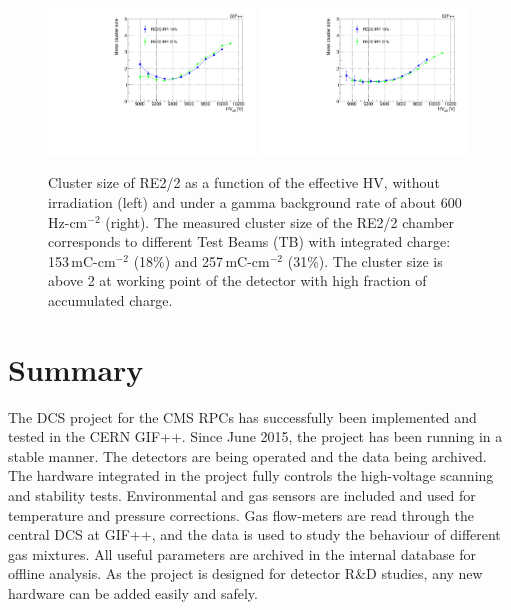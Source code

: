 \begin{figure}[h]
\centering
\includegraphics[width=0.49\textwidth,keepaspectratio=true]{fig/wincc/longevity/RE2-ClusterSize.pdf}
\includegraphics[width=0.49\textwidth,keepaspectratio=true]{fig/wincc/longevity/RE2-ClusterSize-600.pdf}
\caption{Cluster size of RE2/2 as a function of the effective HV, without irradiation (left) and under a gamma background rate of about 600\,Hz-cm$^{-2}$ (right). The measured cluster size of the RE2/2 chamber corresponds to different Test Beams (TB) with integrated charge: 153\,mC-cm$^{-2}$ (18\%) and 257\,mC-cm$^{-2}$ (31\%). The cluster size is above 2 at working point of the detector with high fraction of accumulated charge.}
\label{fig:cms_rpc_cluster_diff_periods}
\end{figure}

\section{Summary} 
The DCS project for the CMS RPCs has successfully been implemented and tested in the CERN GIF++. Since June 2015, the project has been running in a stable manner. The detectors are being operated and the data being archived. The hardware integrated in the project fully controls the high-voltage scanning and stability tests. Environmental and gas sensors are included and used for temperature and pressure corrections. Gas flow-meters are read through the central DCS at GIF++, and the data is used to study the behaviour of different gas mixtures. All useful parameters are archived in the internal database for offline analysis. As the project is designed for detector R\&D studies, any new hardware can be added easily and safely.

